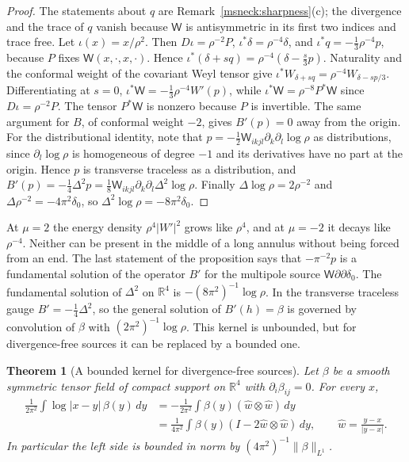 \documentclass[11pt]{article}
\numberwithin{equation}{section}
\newtheorem{theorem}{Theorem}[section]
\theoremstyle{definition}
\theoremstyle{remark}
\begin{document}
\begin{proof}
The statements about \(q\) are Remark~\ref{msneck:sharpness}(c); the
divergence and the trace of \(q\) vanish because \(\mathsf W\) is
antisymmetric in its first two indices and trace free. Let \(\iota(x)=x/\rho^2\).
Then \(D\iota=\rho^{-2}P\), \(\iota^*\delta=\rho^{-4}\delta\), and
\(\iota^*q=-\tfrac13\rho^{-4}p\), because \(P\) fixes \(\mathsf W(x,\cdot,x,\cdot)\).
Hence \(\iota^*(\delta+sq)=\rho^{-4}(\delta-\tfrac s3p)\). Naturality and the
conformal weight of the covariant Weyl tensor give
\(\iota^*W_{\delta+sq}=\rho^{-4}W_{\delta-sp/3}\). Differentiating at \(s=0\),
\(\iota^*\mathsf W=-\tfrac13\rho^{-4}W'(p)\), while
\(\iota^*\mathsf W=\rho^{-8}P^*\mathsf W\) since \(D\iota=\rho^{-2}P\). The
tensor \(P^*\mathsf W\) is nonzero because \(P\) is invertible. The same
argument for \(B\), of conformal weight \(-2\), gives \(B'(p)=0\) away
from the origin. For the distributional identity, note that
\(p=-\tfrac12\mathsf W_{ikjl}\partial_k\partial_l\log\rho\) as distributions,
since \(\partial_l\log\rho\) is homogeneous of degree \(-1\) and its
derivatives have no part at the origin. Hence \(p\) is transverse
traceless as a distribution, and
\(B'(p)=-\tfrac14\Delta^2p=\tfrac18\mathsf W_{ikjl}\partial_k\partial_l\Delta^2\log\rho\).
Finally \(\Delta\log\rho=2\rho^{-2}\) and \(\Delta\rho^{-2}=-4\pi^2\delta_0\), so
\(\Delta^2\log\rho=-8\pi^2\delta_0\).
\end{proof}

At \(\mu=2\) the energy density \(\rho^4|W'|^2\) grows like \(\rho^4\), and at
\(\mu=-2\) it decays like \(\rho^{-4}\). Neither can be present in the middle
of a long annulus without being forced from an end. The last statement
of the proposition says that \(-\pi^{-2}p\) is a fundamental solution of
the operator \(B'\) for the multipole source \(\mathsf W\partial\partial\delta_0\).
The fundamental solution of \(\Delta^2\) on \(\mathbb R^4\) is
\(-(8\pi^2)^{-1}\log\rho\). In the transverse traceless gauge
\(B'=-\tfrac14\Delta^2\), so the general solution of
\(B'(h)=\beta\) is governed by convolution of \(\beta\) with
\((2\pi^2)^{-1}\log\rho\). This kernel is unbounded, but for divergence-free
sources it can be replaced by a bounded one.

\begin{theorem}[A bounded kernel for divergence-free sources]
\label{msneck:potential}
Let \(\beta\) be a smooth symmetric tensor field of compact support on
\(\mathbb R^4\) with \(\partial_i\beta_{ij}=0\). For every \(x\),
\begin{align*}
 \frac1{2\pi^2}\int\log|x-y|\,\beta(y)\,dy
 &=-\frac1{2\pi^2}\int\beta(y)(\hat w\otimes\hat w)\,dy\\
 &=\frac1{4\pi^2}\int\beta(y)(I-2\hat w\otimes\hat w)\,dy,\qquad
 \hat w=\frac{y-x}{|y-x|}.
\end{align*}
In particular the left side is bounded in norm by
\((4\pi^2)^{-1}\|\beta\|_{L^1}\).
\end{theorem}
\end{document}
